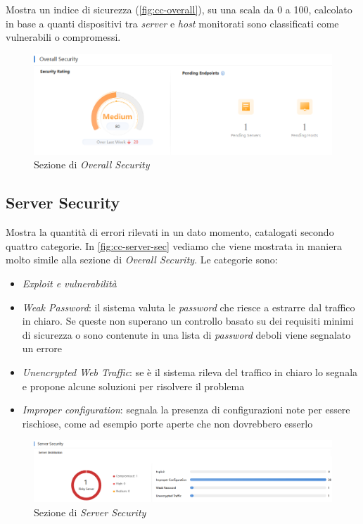 Mostra un indice di sicurezza (\autoref{fig:cc-overall}), su una scala da 0 a 100, calcolato in base a quanti dispositivi tra \emph{server} e \emph{host} monitorati sono classificati come vulnerabili o compromessi.

\begin{figure}[!htbp]
    \centering
    \includegraphics[width=0.8\linewidth]{images/ndr/overall-sec.png}
    \caption{Sezione di \emph{Overall Security}}
    \label{fig:cc-overall}
\end{figure}

\subsection{Server Security}
\label{sec:cc-server-sec}

Mostra la quantità di errori rilevati in un dato momento, catalogati secondo quattro categorie. In \autoref{fig:cc-server-sec} vediamo che viene mostrata in maniera molto simile alla sezione di \emph{Overall Security}. Le categorie sono:

\begin{itemize}
    \item \emph{Exploit e vulnerabilità}
    \item \emph{Weak Password}: il sistema valuta le \emph{password} che riesce a estrarre dal traffico in chiaro. Se queste non superano un controllo basato su dei requisiti minimi di sicurezza o sono contenute in una lista di \emph{password} deboli viene segnalato un errore
    \item \emph{Unencrypted Web Traffic}: se è il sistema rileva del traffico in chiaro lo segnala e propone alcune soluzioni per risolvere il problema 
    \item \emph{Improper configuration}: segnala la presenza di configurazioni note per essere rischiose, come ad esempio porte aperte che non dovrebbero esserlo
\end{itemize}

\begin{figure}[!htbp]
    \centering
    \includegraphics[width=0.9\linewidth]{images/ndr/server-sec.png}
    \caption{Sezione di \emph{Server Security}}
    \label{fig:cc-server-sec}
\end{figure}

